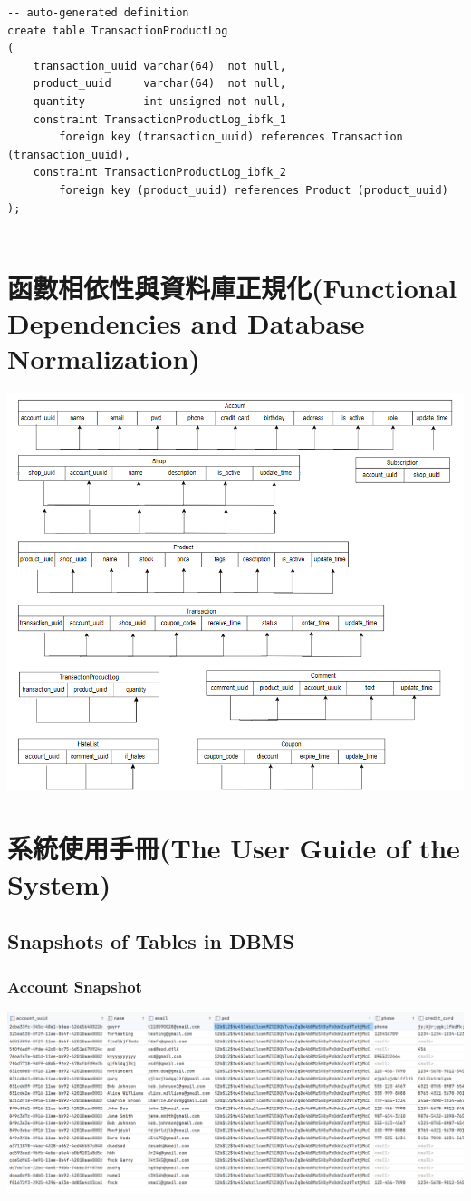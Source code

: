 \documentclass[a4paper, 12pt]{article}
\begin{document}
\begin{verbatim}
-- auto-generated definition
create table TransactionProductLog
(
    transaction_uuid varchar(64)  not null,
    product_uuid     varchar(64)  not null,
    quantity         int unsigned not null,
    constraint TransactionProductLog_ibfk_1
        foreign key (transaction_uuid) references Transaction (transaction_uuid),
    constraint TransactionProductLog_ibfk_2
        foreign key (product_uuid) references Product (product_uuid)
);


\end{verbatim}



\newpage
\section{函數相依性與資料庫正規化(Functional Dependencies and Database Normalization)}
\includegraphics[scale=0.7]{image/fd.png}
\section{系統使用手冊(The User Guide of the System)}
\subsection{Snapshots of Tables in DBMS}
\subsubsection{Account Snapshot}
\includegraphics[scale=0.4]{snapshots/account.png}
\end{document}
